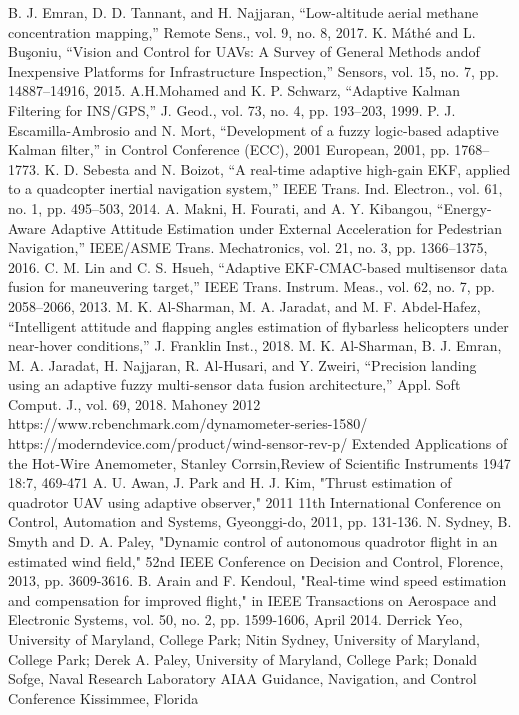 \documentclass[conference]{IEEEtran}
\begin{document}
\begin{thebibliography}{00}
B. J. Emran, D. D. Tannant, and H. Najjaran, “Low-altitude aerial methane concentration mapping,” Remote Sens., vol. 9, no. 8, 2017.
 K. Máthé and L. Buşoniu, “Vision and Control for UAVs: A Survey of General Methods andof Inexpensive Platforms for Infrastructure Inspection,” Sensors, vol. 15, no. 7, pp. 14887–14916, 2015.
 A.H.Mohamed and K. P. Schwarz, “Adaptive Kalman Filtering for INS/GPS,” J. Geod., vol. 73, no. 4, pp. 193–203, 1999.
 P. J. Escamilla-Ambrosio and N. Mort, “Development of a fuzzy logic-based adaptive Kalman filter,” in Control Conference (ECC), 2001 European, 2001, pp. 1768–1773.
 K. D. Sebesta and N. Boizot, “A real-time adaptive high-gain EKF, applied to a quadcopter inertial navigation system,” IEEE Trans. Ind. Electron., vol. 61, no. 1, pp. 495–503, 2014.
 A. Makni, H. Fourati, and A. Y. Kibangou, “Energy-Aware Adaptive Attitude Estimation under External Acceleration for Pedestrian Navigation,” IEEE/ASME Trans. Mechatronics, vol. 21, no. 3, pp. 1366–1375, 2016.
 C. M. Lin and C. S. Hsueh, “Adaptive EKF-CMAC-based multisensor data fusion for maneuvering target,” IEEE Trans. Instrum. Meas., vol. 62, no. 7, pp. 2058–2066, 2013.
 M. K. Al-Sharman, M. A. Jaradat, and M. F. Abdel-Hafez, “Intelligent attitude and flapping angles estimation of flybarless helicopters under near-hover conditions,” J. Franklin Inst., 2018.
 M. K. Al-Sharman, B. J. Emran, M. A. Jaradat, H. Najjaran, R. Al-Husari, and Y. Zweiri, “Precision landing using an adaptive fuzzy multi-sensor data fusion architecture,” Appl. Soft Comput. J., vol. 69, 2018.
		 Mahoney 2012
 https://www.rcbenchmark.com/dynamometer-series-1580/
 https://moderndevice.com/product/wind-sensor-rev-p/
 Extended Applications of the Hot‐Wire Anemometer, Stanley Corrsin,Review of Scientific Instruments 1947 18:7, 469-471 
 A. U. Awan, J. Park and H. J. Kim, "Thrust estimation of quadrotor UAV using adaptive observer," 2011 11th International Conference on Control, Automation and Systems, Gyeonggi-do, 2011, pp. 131-136.
 N. Sydney, B. Smyth and D. A. Paley, "Dynamic control of autonomous quadrotor flight in an estimated wind field," 52nd IEEE Conference on Decision and Control, Florence, 2013, pp. 3609-3616.
 B. Arain and F. Kendoul, "Real-time wind speed estimation and compensation for improved flight," in IEEE Transactions on Aerospace and Electronic Systems, vol. 50, no. 2, pp. 1599-1606, April 2014.
Derrick Yeo, University of Maryland, College Park; Nitin Sydney, University of Maryland, College Park; Derek A. Paley, University of Maryland, College Park; Donald Sofge, Naval Research Laboratory AIAA Guidance, Navigation, and Control Conference Kissimmee, Florida

\end{thebibliography}
\end{document}
